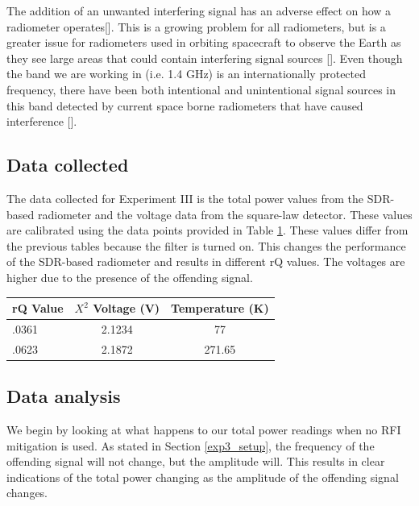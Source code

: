 The addition of an unwanted interfering signal has an adverse effect on how a radiometer operates[\cite{Ellingson}].  This is a growing problem for all radiometers, but is a greater issue for radiometers used in orbiting spacecraft to observe the Earth as they see large areas that could contain interfering signal sources [\cite{DeRooRFI}].  Even though the band we are working in (i.e. 1.4 GHz) is an internationally protected frequency, there have been both intentional and unintentional signal sources in this band detected by current space borne radiometers that have caused interference [\cite{Forte}].

\subsection{Data collected}

The data collected for Experiment III is the total power values from the SDR-based radiometer and the voltage data from the square-law detector.  These values are calibrated using the data points provided in Table \ref{exp3_datapoints}.  These values differ from the previous tables because the filter is turned on.  This changes the performance of the SDR-based radiometer and results in different rQ values.  The voltages are higher due to the presence of the offending signal.

\begin{table}[h!tb] \centering
{}
\label{exp3_datapoints}
\begin{tabular}{lcc} \hline
\textbf{rQ Value} & \textbf{$X^2$ Voltage (V)} & \textbf{Temperature (K)} \\ \hline
.0361 & 2.1234 & 77 \\
.0623 & 2.1872 & 271.65 \\ \hline
\end{tabular}
\end{table}

\subsection{Data analysis}

We begin by looking at what happens to our total power readings when no RFI mitigation is used.  As stated in Section \ref{exp3_setup}, the frequency of the offending signal will not change, but the amplitude will.  This results in clear indications of the total power changing as the amplitude of the offending signal changes.  

